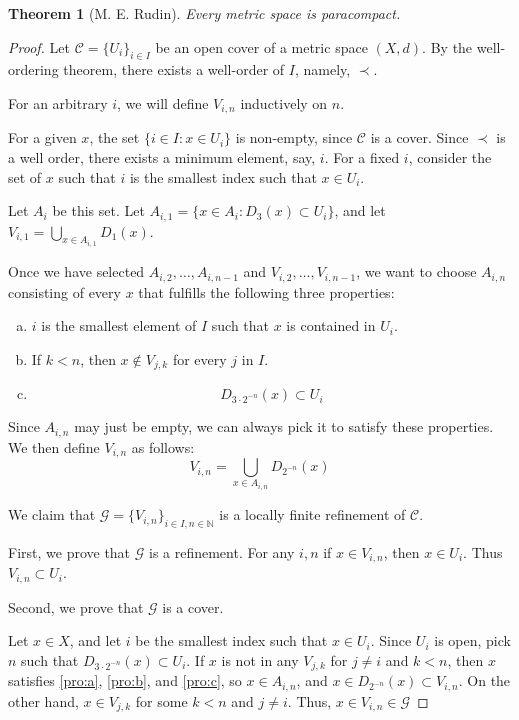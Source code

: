 \documentclass[openany, amssymb, psamsfonts]{amsart}
\newtheorem{thm}{Theorem}[section]
\theoremstyle{definition}
\numberwithin{equation}{section}
\begin{document}
\begin{thm}[M. E. Rudin]\label{thm:3.6}
  Every metric space is paracompact. 
\end{thm}
\begin{proof}
  Let $\mathcal{C} = \{U_i\}_{i\in I}$ be an open cover of a metric space $(X,d)$. By the well-ordering theorem, there exists a well-order of $I$, namely, $\prec$. 

  For an arbitrary $i$, we will define $V_{i,n}$ inductively on $n$. 

  For a given $x$, the set $\{i \in I : x \in U_i\}$ is non-empty, since $\mathcal{C}$ is a cover. Since $\prec$ is a well order, there exists a minimum element, say, $i$. For a fixed $i$, consider the set of $x$ such that $i$ is the smallest index such that $x\in U_i$. 

  Let $A_i$ be this set. Let $A_{i,1} = \{x \in A_i: D_3(x) \subset U_i\}$, and let $V_{i,1} = \bigcup_{x\in A_{i,1}} D_1(x)$.   

  Once we have selected $A_{i,2}, \ldots, A_{i, n-1}$ and $V_{i,2}, \ldots, V_{i,n-1}$, we want to choose $A_{i,n}$ consisting of every $x$ that fulfills the following three properties:
  \begin{enumerate}[(a)]
    \item \label{pro:a}
    $i$ is the smallest element of $I$ such that $x$ is contained in $U_i$. 
    \item \label{pro:b}
    If $ k < n$, then $x \not\in V_{j,k}$ for every $j$ in $I$.
    \item \label{pro:c}
    \[D_{3 \cdot 2^{-n}}(x)\subset U_i\]
  \end{enumerate}

  Since $A_{i,n}$ may just be empty, we can always pick it to satisfy these properties. We then define $V_{i,n}$ as follows:
  \[
    V_{i,n} = \bigcup_{x \in A_{i,n}} D_{2^{-n}}(x)
  \]

  We claim that $\mathcal{G} = \{V_{i,n}\}_{i \in I, n \in \mathbb N}$ is a locally finite refinement of $\mathcal{C}$. 

  First, we prove that $\mathcal{G}$ is a refinement. For any $i,n$ if $x \in V_{i,n}$, then $x\in U_i$. Thus $V_{i,n} \subset U_i$. 

  Second, we prove that $\mathcal{G}$ is a cover.

  Let $x\in X$, and let $i$ be the smallest index such that $x \in U_i$. Since $U_i$ is open, pick $n$ such that $D_{3 \cdot 2^{-n}}(x) \subset U_i$. If $x$ is not in any  $V_{j,k}$ for $j\neq i$ and $k < n$, then $x$ satisfies \ref{pro:a}, \ref{pro:b}, and \ref{pro:c}, so $x \in A_{i,n}$, and $x \in D_{2^{-n}}(x)\subset V_{i,n}$. On the other hand, $x \in V_{j,k}$ for some $k < n$ and $j \neq i$. Thus, $x \in V_{i,n} \in \mathcal{G}$


\end{proof}
\end{document}
